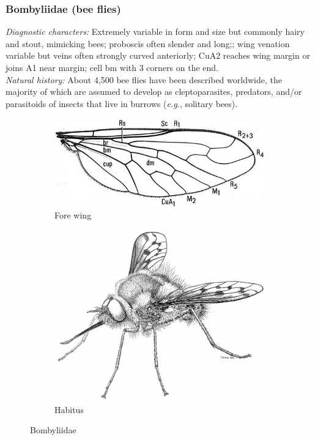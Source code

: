 \documentclass[letterpaper, 11pt]{article}
\begin{document}
\subsubsection{Bombyliidae (bee flies)}
\noindent{}\textit{Diagnostic characters:} Extremely variable in form and size but commonly hairy and stout, mimicking bees; proboscis often slender and long;; wing venation variable but veins often strongly curved anteriorly; CuA2 reaches wing margin or joins A1 near margin; cell bm with 3 corners on the end.\\

\noindent{}\textit{Natural history:} About 4,500 bee flies have been described worldwide, the majority of which are assumed to develop as cleptoparasites, predators, and/or parasitoids of insects that live in burrows (\textit{e.g.}, solitary bees).

\begin{figure}[ht!]
    \centering
    \begin{subfigure}[ht!]{0.45\textwidth}
        \includegraphics[width=\textwidth]{BombyliidWing}
        \caption{Fore wing \citep[][Fig. 45.1]{mcalpine1981manual}}
        \label{fig:bombyl2}
    \end{subfigure}
    \qquad 
    \begin{subfigure}[ht!]{0.4\textwidth}
        \includegraphics[width=\textwidth]{BombyliidHabitus}
        \caption{Habitus \citep[][Fig. 45.1]{mcalpine1981manual}}
        \label{fig:bombyl1}
    \end{subfigure}
    \caption{Bombyliidae}\label{fig:bombyls}
\end{figure}
\end{document}

